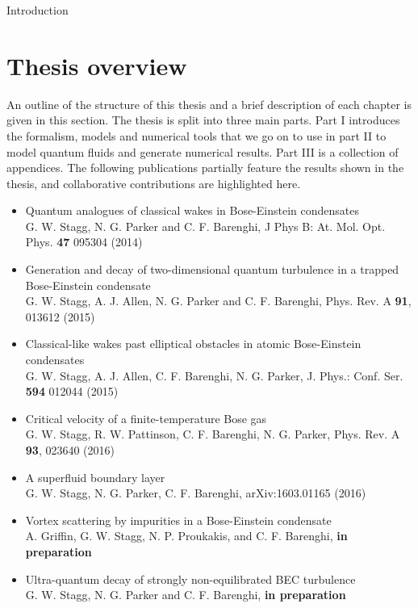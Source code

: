 \begin{chapter}{\label{cha:bose_gases}Introduction}
\section{Thesis overview}
An outline of the structure of this thesis and a brief description of each chapter is given in this section. The thesis is split into three main parts. Part I introduces the formalism, models and numerical tools that we go on to use in part II to model quantum fluids and generate numerical results. Part III is a collection of appendices. The following publications partially feature the results shown in the thesis, and collaborative contributions are highlighted here.
\begin{itemize}
	\item Quantum analogues of classical wakes in Bose-Einstein condensates\\
	{\footnotesize G. W. Stagg, N. G. Parker and C. F. Barenghi, J Phys B: At. Mol. Opt. Phys. {\bf 47} 095304 (2014)}
	\item Generation and decay of two-dimensional quantum turbulence in a trapped Bose-Einstein condensate\\
	{\footnotesize G. W. Stagg, A. J. Allen, N. G. Parker and C. F. Barenghi, Phys. Rev. A {\bf 91}, 013612 (2015)}
	\item Classical-like wakes past elliptical obstacles in atomic Bose-Einstein condensates\\
	{\footnotesize G. W. Stagg, A. J. Allen, C. F. Barenghi, N. G. Parker, J. Phys.: Conf. Ser. {\bf 594} 012044 (2015)}
	\item Critical velocity of a finite-temperature Bose gas\\
	{\footnotesize G. W. Stagg, R. W. Pattinson, C. F. Barenghi, N. G. Parker, Phys. Rev. A {\bf 93}, 023640 (2016)}
	\item A superfluid boundary layer\\
	{\footnotesize G. W. Stagg, N. G. Parker, C. F. Barenghi, arXiv:1603.01165 (2016)}
	\item Vortex scattering by impurities in a Bose-Einstein condensate\\
	{\footnotesize A. Griffin, G. W. Stagg, N. P. Proukakis, and C. F. Barenghi, {\bf in preparation}}
	\item Ultra-quantum decay of strongly non-equilibrated BEC turbulence\\
	{\footnotesize G. W. Stagg, N. G. Parker and C. F. Barenghi, {\bf in preparation}}
\end{itemize}


\end{chapter}
